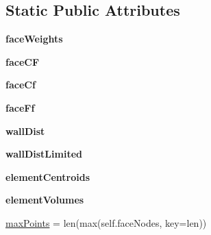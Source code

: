 \subsection*{Static Public Attributes}
\begin{DoxyCompactItemize}
\item 
\mbox{\label{classpy_f_v_m_1_1_polymesh_1_1_polymesh_a71beda9a908ea86e86e1c139bdaa12a1}} 
{\bfseries face\+Weights}
\item 
\mbox{\label{classpy_f_v_m_1_1_polymesh_1_1_polymesh_a482e281f11435a56fda43eb6be434a52}} 
{\bfseries face\+CF}
\item 
\mbox{\label{classpy_f_v_m_1_1_polymesh_1_1_polymesh_a5d93e8e8991496a05ade32c39b55f7ee}} 
{\bfseries face\+Cf}
\item 
\mbox{\label{classpy_f_v_m_1_1_polymesh_1_1_polymesh_a80b4e19a3761c3c91cbe5ef37baae86f}} 
{\bfseries face\+Ff}
\item 
\mbox{\label{classpy_f_v_m_1_1_polymesh_1_1_polymesh_ae63ffb43df15faaa9bd748c32f355ff2}} 
{\bfseries wall\+Dist}
\item 
\mbox{\label{classpy_f_v_m_1_1_polymesh_1_1_polymesh_af23adefd8a9d51bb0c02acd481eac890}} 
{\bfseries wall\+Dist\+Limited}
\item 
\mbox{\label{classpy_f_v_m_1_1_polymesh_1_1_polymesh_afd5a0b33a478c0c203ec00bfa4000092}} 
{\bfseries element\+Centroids}
\item 
\mbox{\label{classpy_f_v_m_1_1_polymesh_1_1_polymesh_a4261391fc868885ea124558d76ad3d80}} 
{\bfseries element\+Volumes}
\item 
\mbox{\hyperlink{classpy_f_v_m_1_1_polymesh_1_1_polymesh_afebf2be139681c451afde30c50beba9d}{max\+Points}} = len(max(self.\+face\+Nodes, key=len))
\item 
\mbox{\label{classpy_f_v_m_1_1_polymesh_1_1_polymesh_a4b7ebca4229530656a8d1fe38587005e}} 

\end{DoxyCompactItemize}
